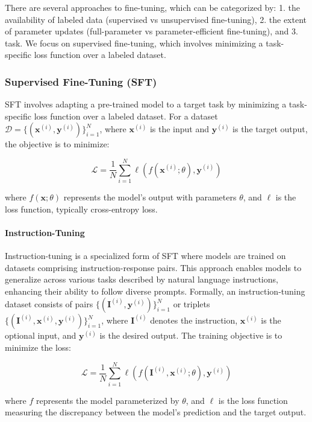 \documentclass{article}
\newcounter{para}
\begin{document}
There are several approaches to fine-tuning, which can be categorized by: 1. the availability of labeled data (supervised vs unsupervised fine-tuning), 2. the extent of parameter updates (full-parameter vs parameter-efficient fine-tuning), and 3. task. We focus on supervised fine-tuning, which involves minimizing a task-specific loss function over a labeled dataset.

\subsubsection{Supervised Fine-Tuning (SFT)}\label{sec:pre-sft}

SFT involves adapting a pre-trained model to a target task by minimizing a task-specific loss function over a labeled dataset. For a dataset \( \mathcal{D} = \{(\mathbf{x}^{(i)}, \mathbf{y}^{(i)})\}_{i=1}^N \), where \( \mathbf{x}^{(i)} \) is the input and \( \mathbf{y}^{(i)} \) is the target output, the objective is to minimize:

\[
\mathcal{L} = \frac{1}{N} \sum_{i=1}^N \ell(f(\mathbf{x}^{(i)}; \theta), \mathbf{y}^{(i)})
\]

where \( f(\mathbf{x}; \theta) \) represents the model's output with parameters \( \theta \), and \( \ell \) is the loss function, typically cross-entropy loss.

\paragraph{Instruction-Tuning} \label{sec:pre-it}

Instruction-tuning is a specialized form of SFT where models are trained on datasets comprising instruction-response pairs. This approach enables models to generalize across various tasks described by natural language instructions, enhancing their ability to follow diverse prompts. Formally, an instruction-tuning dataset consists of pairs \( \{(\mathbf{I}^{(i)}, \mathbf{y}^{(i)})\}_{i=1}^N \) or triplets \( \{(\mathbf{I}^{(i)}, \mathbf{x}^{(i)}, \mathbf{y}^{(i)})\}_{i=1}^N \), where \( \mathbf{I}^{(i)} \) denotes the instruction, \( \mathbf{x}^{(i)} \) is the optional input, and \( \mathbf{y}^{(i)} \) is the desired output. The training objective is to minimize the loss:

\[
\mathcal{L} = \frac{1}{N} \sum_{i=1}^N \ell(f(\mathbf{I}^{(i)}, \mathbf{x}^{(i)}; \theta), \mathbf{y}^{(i)})
\]

where \( f \) represents the model parameterized by \( \theta \), and \( \ell \) is the loss function measuring the discrepancy between the model's prediction and the target output.
\end{document}
